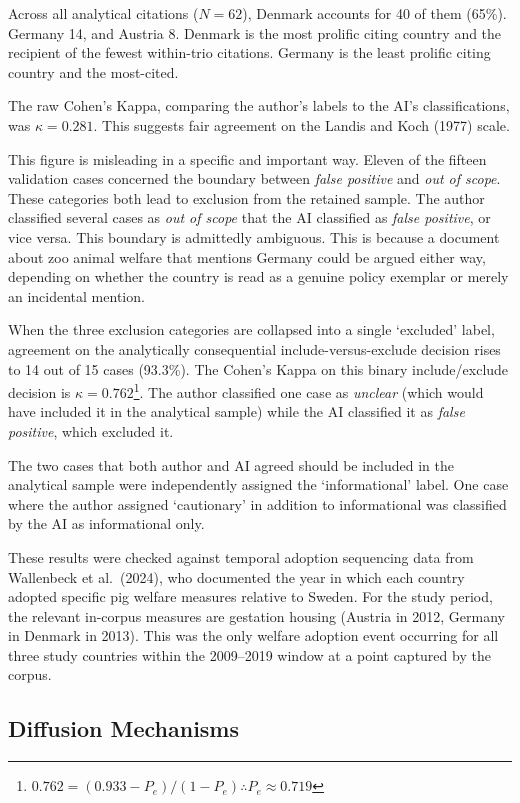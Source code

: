 \documentclass[twocolumn, 10pt, a4paper]{article}
\begin{document}
Across all analytical citations ($N = 62$), Denmark accounts for 40 of them (65\%).
Germany 14, and Austria 8. Denmark is the most prolific citing country and the
recipient of the fewest within-trio citations. Germany is the least prolific citing
country and the most-cited.

The raw Cohen's Kappa, comparing the author's labels to the AI's classifications,
was $\kappa = 0.281$. This suggests fair agreement on the Landis and Koch (1977)
scale.

This figure is misleading in a specific and important way. Eleven of the fifteen
validation cases concerned the boundary between \textit{false positive} and
\textit{out of scope}. These categories both lead to exclusion from the retained
sample. The author classified several cases as \textit{out of scope} that the AI
classified as \textit{false positive}, or vice versa. This boundary is admittedly
ambiguous. This is because a document about zoo animal welfare that mentions Germany
could be argued either way, depending on whether the country is read as a genuine
policy exemplar or merely an incidental mention.

When the three exclusion categories are collapsed into a single `excluded' label,
agreement on the analytically consequential include-versus-exclude decision rises to
14 out of 15 cases (93.3\%). The Cohen's Kappa on this binary include/exclude
decision is $\kappa = 0.762$\footnote{%
$0.762 = (0.933 - P_e) / (1 - P_e) \therefore P_e \approx 0.719$}. The author
classified one case as \textit{unclear} (which would have included it in the
analytical sample) while the AI classified it as \textit{false positive}, which
excluded it.

The two cases that both author and AI agreed should be included in the analytical
sample were independently assigned the `informational' label. One case where the
author assigned `cautionary' in addition to informational was classified by the AI
as informational only.

These results were checked against temporal adoption sequencing data from Wallenbeck
et al.\ (2024), who documented the year in which each country adopted specific pig
welfare measures relative to Sweden. For the study period, the relevant in-corpus
measures are gestation housing (Austria in 2012, Germany in Denmark in 2013). This
was the only welfare adoption event occurring for all three study countries within
the 2009--2019 window at a point captured by the corpus.

\subsection{Diffusion Mechanisms}
\end{document}
